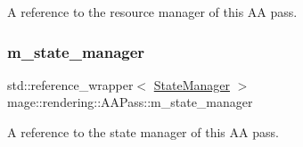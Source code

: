A reference to the resource manager of this AA pass. \mbox{\label{classmage_1_1rendering_1_1_a_a_pass_a7fea13d1b4462ef4b9b1f6d82ce5aac4}} 
\subsubsection{\texorpdfstring{m\+\_\+state\+\_\+manager}{m\_state\_manager}}
{\footnotesize\ttfamily std\+::reference\+\_\+wrapper$<$ \mbox{\hyperlink{classmage_1_1rendering_1_1_state_manager}{State\+Manager}} $>$ mage\+::rendering\+::\+A\+A\+Pass\+::m\+\_\+state\+\_\+manager\hspace{0.3cm}{\ttfamily [private]}}

A reference to the state manager of this AA pass. 